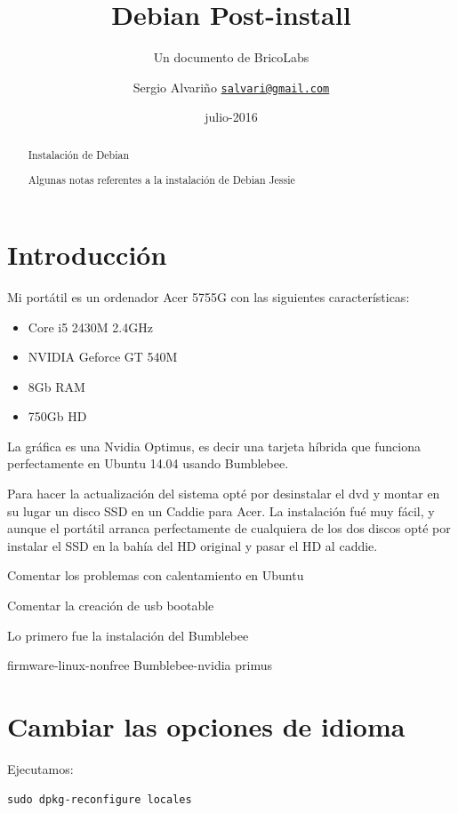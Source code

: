 \documentclass[12pt,spanish,]{article}
\title{Debian Post-install}
\subtitle{Un documento de BricoLabs}
\author{Sergio Alvariño
\href{mailto:salvari@gmail.com}{\nolinkurl{salvari@gmail.com}}}
\date{julio-2016}
\begin{document}
\maketitle
\begin{abstract}
Instalación de Debian

Algunas notas referentes a la instalación de Debian Jessie
\end{abstract}

{
\hypersetup{linkcolor=black}
\setcounter{tocdepth}{3}
\tableofcontents
}
\section{Introducción}\label{introducciuxf3n}

Mi portátil es un ordenador Acer 5755G con las siguientes
características:

\begin{itemize}
\item
  Core i5 2430M 2.4GHz
\item
  NVIDIA Geforce GT 540M
\item
  8Gb RAM
\item
  750Gb HD
\end{itemize}

La gráfica es una Nvidia Optimus, es decir una tarjeta híbrida que
funciona perfectamente en Ubuntu 14.04 usando Bumblebee.

Para hacer la actualización del sistema opté por desinstalar el dvd y
montar en su lugar un disco SSD en un Caddie para Acer. La instalación
fué muy fácil, y aunque el portátil arranca perfectamente de cualquiera
de los dos discos opté por instalar el SSD en la bahía del HD original y
pasar el HD al caddie.

Comentar los problemas con calentamiento en Ubuntu

Comentar la creación de usb bootable

Lo primero fue la instalación del Bumblebee

firmware-linux-nonfree Bumblebee-nvidia primus

\section{Cambiar las opciones de
idioma}\label{cambiar-las-opciones-de-idioma}

Ejecutamos:

\begin{verbatim}
sudo dpkg-reconfigure locales
\end{verbatim}
\end{document}

